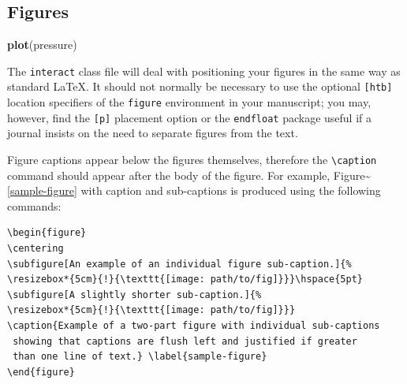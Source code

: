 \documentclass[]{interact}
\theoremstyle{plain}%
\theoremstyle{definition}
\theoremstyle{remark}
\newenvironment{Shaded}{\begin{snugshade}}{\end{snugshade}}
\newcommand{\KeywordTok}[1]{\textcolor[rgb]{0.13,0.29,0.53}{\textbf{#1}}}
\newcommand{\NormalTok}[1]{#1}
\begin{document}
\hypertarget{figures}{%
\subsection{Figures}\label{figures}}

\begin{Shaded}
\begin{Highlighting}[]
\KeywordTok{plot}\NormalTok{(pressure)}
\end{Highlighting}
\end{Shaded}

The \texttt{interact} class file will deal with positioning your figures in the same way as standard \LaTeX. It should not normally be necessary to use the optional \texttt{{[}htb{]}} location specifiers of the \texttt{figure} environment in your manuscript; you may, however, find the \texttt{{[}p{]}} placement option or the \texttt{endfloat} package useful if a journal insists on the need to separate figures from the text.

Figure captions appear below the figures themselves, therefore the \texttt{\textbackslash{}caption} command should appear after the body of the figure. For example, Figure\textasciitilde{}\ref{sample-figure} with caption and sub-captions is produced using the following commands:

\begin{verbatim}
\begin{figure}
\centering
\subfigure[An example of an individual figure sub-caption.]{%
\resizebox*{5cm}{!}{\texttt{[image: path/to/fig]}}}\hspace{5pt}
\subfigure[A slightly shorter sub-caption.]{%
\resizebox*{5cm}{!}{\texttt{[image: path/to/fig]}}}
\caption{Example of a two-part figure with individual sub-captions
 showing that captions are flush left and justified if greater
 than one line of text.} \label{sample-figure}
\end{figure}
\end{verbatim}
\end{document}
